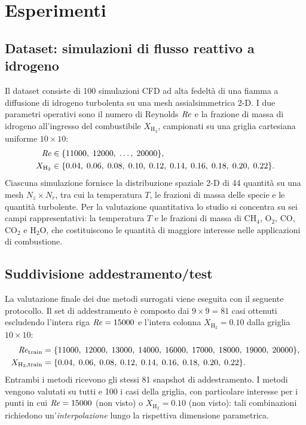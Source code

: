 \section{Esperimenti}
\label{sec:experiments}

\subsection{Dataset: simulazioni di flusso reattivo a idrogeno}

Il dataset consiste di 100 simulazioni CFD ad alta fedeltà di una fiamma a diffusione di idrogeno turbolenta su una mesh assialsimmetrica 2-D. I due parametri operativi sono il numero di Reynolds $\mathit{Re}$ e la frazione di massa di idrogeno all'ingresso del combustibile $X_{\mathrm{H_2}}$, campionati su una griglia cartesiana uniforme $10\times10$:
\begin{align}
    \mathit{Re} &\in \{11000,\;12000,\;\ldots,\;20000\}, \\
    X_{\mathrm{H_2}} &\in \{0.04,\;0.06,\;0.08,\;0.10,\;0.12,\;0.14,\;0.16,\;0.18,\;0.20,\;0.22\}.
\end{align}
Ciascuna simulazione fornisce la distribuzione spaziale 2-D di 44 quantità su una mesh $N_z \times N_r$, tra cui la temperatura $T$, le frazioni di massa delle specie e le quantità turbolente. Per la valutazione quantitativa lo studio si concentra su sei campi rappresentativi: la temperatura $T$ e le frazioni di massa di $\mathrm{CH_4}$, $\mathrm{O_2}$, $\mathrm{CO}$, $\mathrm{CO_2}$ e $\mathrm{H_2O}$, che costituiscono le quantità di maggiore interesse nelle applicazioni di combustione.

\subsection{Suddivisione addestramento/test}

La valutazione finale dei due metodi surrogati viene eseguita con il seguente protocollo. Il set di addestramento è composto dai $9\times9 = 81$ casi ottenuti escludendo l'intera riga $\mathit{Re} = 15000$ e l'intera colonna $X_{\mathrm{H_2}} = 0.10$ dalla griglia $10\times10$:
\begin{align}
    \mathit{Re}_{\mathrm{train}} &= \{11000,\;12000,\;13000,\;14000,\;16000,\;17000,\;18000,\;19000,\;20000\}, \\
    X_{\mathrm{H_2,train}} &= \{0.04,\;0.06,\;0.08,\;0.12,\;0.14,\;0.16,\;0.18,\;0.20,\;0.22\}.
\end{align}
Entrambi i metodi ricevono gli stessi 81 snapshot di addestramento. I metodi vengono valutati su tutti e 100 i casi della griglia, con particolare interesse per i punti in cui $\mathit{Re} = 15000$ (non visto) o $X_{\mathrm{H_2}} = 0.10$ (non visto): tali combinazioni richiedono un'\emph{interpolazione} lungo la rispettiva dimensione parametrica.

